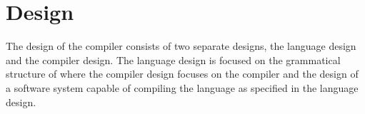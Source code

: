 \section{Design}
\label{sec:design}

The design of the \lang{} compiler consists of two separate designs, the language
design and the compiler design. The language design is focused on the grammatical
structure of \lang{} where the compiler design focuses on the compiler and the design
of a software system capable of compiling the language as specified in the language
design.





